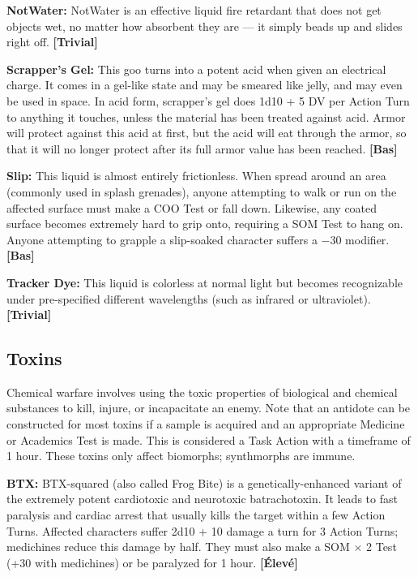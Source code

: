{{\textbf{NotWater:} NotWater is an effective liquid fire retardant that does not get objects wet, no matter how absorbent they are --- it simply beads up and slides right off. \textbf{[Trivial]} 

\textbf{Scrapper’s Gel:} This goo turns into a potent acid when given an electrical charge. It comes in a gel-like state and may be smeared like jelly, and may even be used in space. In acid form, scrapper’s gel does 1d10 + 5 DV per Action Turn to anything it touches, unless the material has been treated against acid. Armor will protect against this acid at first, but the acid will eat through the armor, so that it will no longer protect after its full armor value has been reached. \textbf{[Bas]} 

\textbf{Slip:} This liquid is almost entirely frictionless. When spread around an area (commonly used in splash grenades), anyone attempting to walk or run on the affected surface must make a COO Test or fall down. Likewise, any coated surface becomes extremely hard to grip onto, requiring a SOM Test to hang on. Anyone attempting to grapple a slip-soaked character suffers a $-$30 modifier. \textbf{[Bas]} 

\textbf{Tracker Dye:} This liquid is colorless at normal light but becomes recognizable under pre-specified different wavelengths (such as infrared or ultraviolet). \textbf{[Trivial]} 



\subsection{Toxins} \label{sec:toxins} 

Chemical warfare involves using the toxic properties of biological and chemical substances to kill, injure, or incapacitate an enemy. Note that an antidote can be constructed for most toxins if a sample is acquired and an appropriate Medicine or Academics Test is made. This is considered a Task Action with a timeframe of 1 hour. These toxins only affect biomorphs; synthmorphs are immune. 

\textbf{BTX:} BTX-squared (also called Frog Bite) is a genetically-enhanced variant of the extremely potent cardiotoxic and neurotoxic batrachotoxin. It leads to fast paralysis and cardiac arrest that usually kills the target within a few Action Turns. Affected characters suffer 2d10 + 10 damage a turn for 3 Action Turns; medichines reduce this damage by half. They must also make a SOM $\times$ 2 Test (+30 with medichines) or be paralyzed for 1 hour. \textbf{[Élevé]} 

}}
